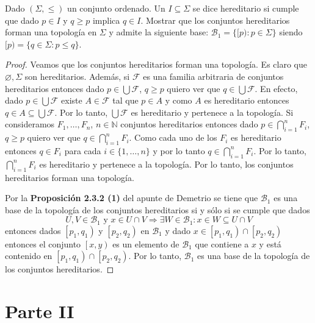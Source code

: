 \documentclass{article}
\theoremstyle{definition}
\newcommand{\N}{\mathbb{N}}
\newcommand{\coint}[2]{\left[ #1, #2 \right)}
\newenvironment{ejercicio}[1]{\begin{trivlist}
\item[\hskip \labelsep {\bfseries Ejercicio}\hskip \labelsep {\bfseries #1.}]}{\end{trivlist}}
\begin{document}
\begin{ejercicio}{12}
    Dado \((\Sigma,\le)\) un conjunto ordenado. Un \( I\subseteq\Sigma \) se dice hereditario si cumple que dado \(p\in I\) y \(q\ge p\) implica \(q\in I\). Mostrar que los conjuntos hereditarios forman una topología en \( \Sigma \) y admite la siguiente base: \(\mathcal{B}_{1}= \{ [p) : p \in \Sigma \} \) siendo \( [p)=\{q\in\Sigma:p\le q\} \).
\end{ejercicio}
\begin{proof}
    Veamos que los conjuntos hereditarios forman una topología. Es claro que \( \varnothing, \Sigma \) son hereditarios.
    Además, si \( \mathcal{F} \) es una familia arbitraria de conjuntos hereditarios entonces dado \( p \in \bigcup \mathcal{F} \), \( q \geq p \) quiero ver que \( q \in \bigcup \mathcal{F} \). En efecto, dado \( p \in \bigcup \mathcal{F} \) existe \( A \in \mathcal{F} \) tal que \( p \in A \) y como \( A \) es hereditario entonces \( q \in A \subseteq \bigcup \mathcal{F} \). Por lo tanto, \( \bigcup \mathcal{F} \) es hereditario y pertenece a la topología.
    Si consideramos \( F_1, \ldots, F_n \), \( n \in \N \) conjuntos hereditarios entonces dado \( p \in \bigcap_{i = 1}^n F_i \), \( q \geq p \) quiero ver que \( q \in \bigcap_{i = 1}^n F_i \). Como cada uno de los \( F_i \) es hereditario entonces \( q \in F_i \) para cada \( i \in \{ 1, \ldots, n \} \) y por lo tanto \( q \in \bigcap_{i = 1}^n F_i \). Por lo tanto, \( \bigcap_{i = 1}^n F_i \) es hereditario y pertenece a la topología. Por lo tanto, los conjuntos hereditarios forman una topología.

    Por la \textbf{Proposición 2.3.2 (1)} del apunte de Demetrio se tiene que \( \mathcal{B}_1 \) es una base de la topología de los conjuntos hereditarios si y sólo si se cumple que dados \[
        U, V \in \mathcal{B}_1 \text{ y } x \in U \cap V \Rightarrow \exists W \in \mathcal{B}_1 : x \in W \subseteq U \cap V
    \]
    entonces dados \( \coint{p_1}{q_1} \) y \( \coint{p_2}{q_2} \) en \( \mathcal{B}_1 \) y dado \( x \in \coint{p_1}{q_1} \cap \coint{p_2}{q_2} \) entonces el conjunto \( \coint{x}{y} \) es un elemento de \( \mathcal{B}_1 \) que contiene a \( x \) y está contenido en \( \coint{p_1}{q_1} \cap \coint{p_2}{q_2} \). Por lo tanto, \( \mathcal{B}_1 \) es una base de la topología de los conjuntos hereditarios.
\end{proof}

\clearpage

\section{Parte II}
\end{document}
